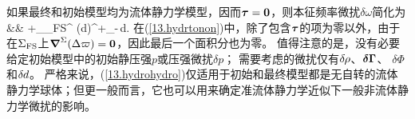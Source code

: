 如果最终和初始模型均为流体静力学模型，因而$\mbox{\boldmath $\bf \tau$}=\mbox{${\bf 0}$}$，则本征频率微扰$\delta\omega$简化为
\eqa
\label{13.hydrohydro}
 \nonumber \\
&&\mbox{}\qquad\qquad
+\int_{\Sigma_{\rm FS}}\bdel^{\Sigma}
(\delta\hspace{-0.1 mm}d)\cdot[\bK_{\rm d}
]^+_-\,d\/\Sigma.
\ena
在(\ref{13.hydrtonon})中，除了包含$\mbox{\boldmath $\bf \tau$}$的项为零以外，由于在$\Sigma_{\rm FS}$上$\mbox{\boldmath $\nabla$}^{\Sigma}(\Delta\varpi)=\mbox{${\bf 0}$}$，因此最后一个面积分也为零。
%
值得注意的是，没有必要给定初始模型中的初始静压强$p$或压强微扰$\delta p$；
需要考虑的微扰仅有$\delta\hspace{-0.2 mm}\rho$、$\mbox{\boldmath $\bf \delta$}\mbox{\boldmath $\bf \Gamma$}$、
$\delta\Phi$和$\delta\hspace{-0.1 mm}d$。
严格来说，(\ref{13.hydrohydro})仅适用于初始和最终模型都是无自转的流体静力学球体；但更一般而言，它也可以用来确定准流体静力学近似下一般非流体静力学微扰的影响。

